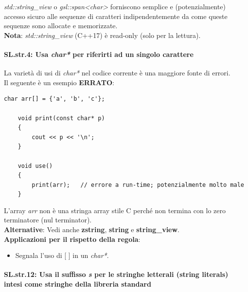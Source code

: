 \textsf{\small \emph{std::string\_view} o \emph{gsl::span<char>} forniscono semplice e (potenzialmente) accesso sicuro alle sequenze di caratteri indipendentemente da come queste sequenze sono allocate e memorizzate. } \\

\textsf{\small \textbf{Nota}: \emph{std::string\_view} (C++17) è read-only (solo per la lettura).} \\

\paragraph{SL.str.4: Usa \emph{char*} per riferirti ad un singolo carattere}

\textsf{\small La varietà di usi di \emph{char*} nel codice corrente è una maggiore fonte di errori.} \\

\textsf{\small Il seguente è un esempio \textbf{\color{red}ERRATO}\normalcolor:}

\begin{lstlisting}[frame=single, rulecolor=\color{red}]
	char arr[] = {'a', 'b', 'c'};
	
	void print(const char* p)
	{
		cout << p << '\n';
	}
	
	void use()
	{
		print(arr);   // errore a run-time; potenzialmente molto male
	}
\end{lstlisting}

\textsf{\small L'array \emph{arr} non è una stringa array stile C perché non termina con lo zero terminatore (nul terminator).} \\

\textsf{\small \textbf{Alternative}: Vedi anche \textbf{zstring}, \textbf{string} e \textbf{string\_view}.} \\

\textsf{\small \textbf{Applicazioni per il rispetto della regola}: }

\begin{itemize}
	\item \textsf{\small Segnala l'uso di [ ] in un \emph{char*}.}
\end{itemize}

\paragraph{SL.str.12: Usa il suffisso \emph{s} per le stringhe letterali (string literals) intesi come stringhe della libreria standard}

